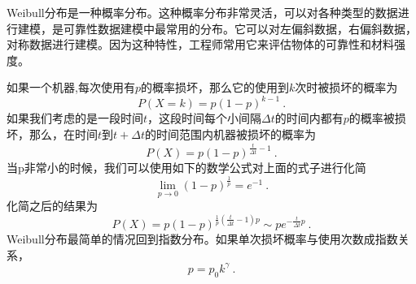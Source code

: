 
Weibull分布是一种概率分布。这种概率分布非常灵活，可以对各种类型的数据进行建模，是可靠性数据建模中最常用的分布。它可以对左偏斜数据，右偏斜数据，对称数据进行建模。因为这种特性，工程师常用它来评估物体的可靠性和材料强度。

如果一个机器,每次使用有$p$的概率损坏，那么它的使用到$k$次时被损坏的概率为
\begin{equation}
P(X=k)=p(1-p)^{k-1}~.
\end{equation}
如果我们考虑的是一段时间$t$，这段时间每个小间隔$\Delta t$的时间内都有$p$的概率被损坏，那么，在时间$t$到$t+\Delta t$的时间范围内机器被损坏的概率为
\begin{equation}
P(X)=p(1-p)^{\frac{t}{\Delta t}-1}~.
\end{equation}
当p非常小的时候，我们可以使用如下的数学公式对上面的式子进行化简
\begin{equation}
\lim _{p \rightarrow 0}(1-p)^{\frac{1}{p}}=e^{-1}~.
\end{equation}
化简之后的结果为
\begin{equation}
P(X)=p(1-p)^{\frac{1}{p}\left(\frac{t}{\Delta t}-1\right) p} \sim p e^{-\frac{t}{\Delta t} p}~.
\end{equation}
Weibull分布最简单的情况回到指数分布。如果单次损坏概率与使用次数成指数关系，
\begin{equation}
p=p_0 k^\gamma~.
\end{equation}